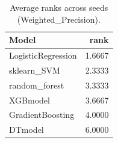 \begin{table}[t]
\centering
\begin{tabular}{lr}
\toprule
Model & rank \\
\midrule
LogisticRegression & 1.6667 \\
sklearn_SVM & 2.3333 \\
random_forest & 3.3333 \\
XGBmodel & 3.6667 \\
GradientBoosting & 4.0000 \\
DTmodel & 6.0000 \\
\bottomrule
\end{tabular}
\caption{Average ranks across seeds (Weighted_Precision).}
\label{tab:avg_rank_Weighted_Precision}
\end{table}